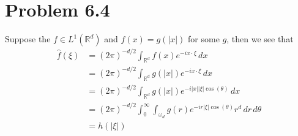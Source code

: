 \documentclass[12pt]{report}
\begin{document}
\section*{Problem 6.4}
Suppose the $f \in L^1(\mathbb{R}^d)$ and $f(x) = g(|x|)$ for some $g$, then we see that
\begin{align*}
  \hat{f}(\xi) &= (2\pi)^{-d/2} \int_{\mathbb{R}^d} f(x)e^{-i x \cdot \xi} \, dx \\
               &=(2\pi)^{-d/2} \int_{\mathbb{R}^d} g(|x|)e^{-i x \cdot \xi} \, dx \\
               &=(2\pi)^{-d/2} \int_{\mathbb{R}^d} g(|x|)e^{-i |x||\xi| \cos(\theta)} \, dx \\
               &=(2\pi)^{-d/2} \int_0^\infty \int_{\omega_d} g(r)e^{-i r|\xi| \cos(\theta)} r^{d} \, dr\, d\theta \\
               &= h(|\xi|)
\end{align*}
\end{document}
